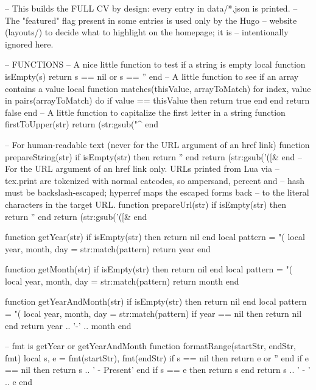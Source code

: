 \documentclass[letterpaper, 10pt]{article}
\begin{document}
\thispagestyle{empty}

\begin{luacode}
	-- This builds the FULL CV by design: every entry in data/*.json is printed.
	-- The "featured" flag present in some entries is used only by the Hugo
	-- website (layouts/) to decide what to highlight on the homepage; it is
	-- intentionally ignored here.

	-- FUNCTIONS
	-- A nice little function to test if a string is empty
	local function isEmpty(s)
		return s == nil or s == ''
	end
	-- A little function to see if an array contains a value
	local function matches(thisValue, arrayToMatch)
		for index, value in pairs(arrayToMatch) do
			if value == thisValue then
				return true
			end
		end
		return false
	end
	-- A little function to capitalize the first letter in a string
	function firstToUpper(str)
		return (str:gsub("^%
	end

	-- For human-readable text (never for the URL argument of an href link)
	function prepareString(str)
		if isEmpty(str) then return '' end
		return (str:gsub('([&%
	end
	-- For the URL argument of an href link only. URLs printed from Lua via
	-- tex.print are tokenized with normal catcodes, so ampersand, percent and
	-- hash must be backslash-escaped; hyperref maps the escaped forms back
	-- to the literal characters in the target URL.
	function prepareUrl(str)
		if isEmpty(str) then return '' end
		return (str:gsub('([&%
	end

	function getYear(str)
		if isEmpty(str) then return nil end
		local pattern = "(%
		local year, month, day = str:match(pattern)
		return year
	end

	function getMonth(str)
		if isEmpty(str) then return nil end
		local pattern = "(%
		local year, month, day = str:match(pattern)
		return month
	end

	function getYearAndMonth(str)
		if isEmpty(str) then return nil end
		local pattern = "(%
		local year, month, day = str:match(pattern)
		if year == nil then return nil end
		return year .. '-' .. month
	end

	-- fmt is getYear or getYearAndMonth
	function formatRange(startStr, endStr, fmt)
		local s, e = fmt(startStr), fmt(endStr)
		if s == nil then return e or '' end
		if e == nil then return s .. ' - Present' end
		if s == e then return s end
		return s .. ' - ' .. e
	end


\end{luacode}
\end{document}
